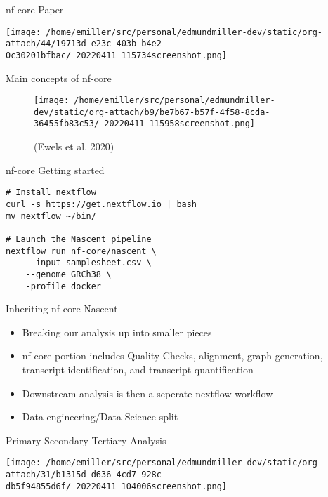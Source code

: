\documentclass[bigger]{beamer}
\begin{document}
\begin{frame}[label={sec:org87c7727}]{nf-core Paper}
\begin{center}
\texttt{[image: /home/emiller/src/personal/edmundmiller-dev/static/org-attach/44/19713d-e23c-403b-b4e2-0c30201bfbac/\_20220411\_115734screenshot.png]}
\end{center}
\end{frame}

\begin{frame}[label={sec:org99708cc}]{Main concepts of nf-core}
\begin{figure}[htbp]
\centering
\texttt{[image: /home/emiller/src/personal/edmundmiller-dev/static/org-attach/b9/be7b67-b57f-4f58-8cda-36455fb83c53/\_20220411\_115958screenshot.png]}
\caption{(Ewels et al. 2020)}
\end{figure}
\end{frame}




\begin{frame}[label={sec:org9a49b32},fragile]{nf-core Getting started}
 \begin{verbatim}
# Install nextflow
curl -s https://get.nextflow.io | bash
mv nextflow ~/bin/

# Launch the Nascent pipeline
nextflow run nf-core/nascent \
    --input samplesheet.csv \
    --genome GRCh38 \
    -profile docker
\end{verbatim}
\end{frame}

\begin{frame}[label={sec:org5f293f7}]{Inheriting nf-core Nascent}
\begin{itemize}
\item Breaking our analysis up into smaller pieces
\item nf-core portion includes Quality Checks, alignment, graph generation, transcript
identification, and transcript quantification
\item Downstream analysis is then a seperate nextflow workflow
\item Data engineering/Data Science split
\end{itemize}
\end{frame}

\begin{frame}[label={sec:org151f3aa}]{Primary-Secondary-Tertiary Analysis}
\begin{center}
\texttt{[image: /home/emiller/src/personal/edmundmiller-dev/static/org-attach/31/b1315d-d636-4cd7-928c-db5f94855d6f/\_20220411\_104006screenshot.png]}
\end{center}
\end{frame}
\end{document}
